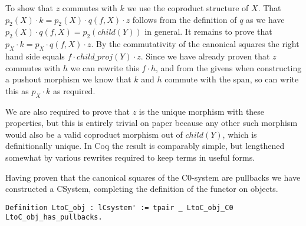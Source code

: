 To show that $z$ commutes with $k$ we use the coproduct structure of $X$. That
$p_2(X)\cdot k = p_2(X)\cdot q(f, X)\cdot z$ follows from the definition of $q$
as we have $p_2(X)\cdot q(f, X) = p_2(child(Y))$ in general. It remains to prove
that $p_X\cdot k = p_X\cdot q(f, X)\cdot z$. By the commutativity of the
canonical squares the right hand side equals $f\cdot child\_proj(Y)\cdot z$.
Since we have already proven that $z$ commutes with $h$ we can rewrite this
$f\cdot h$, and from the givens when constructing a pushout morphism we know
that $k$ and $h$ commute with the span, so can write this as $p_X\cdot k$ as
required.

We are also required to prove that $z$ is the unique morphism with these
properties, but this is entirely trivial on paper because any other such
morphism would also be a valid coproduct morphism out of $child(Y)$, which is
definitionally unique. In Coq the result is comparably simple, but lengthened
somewhat by various rewrites required to keep terms in useful forms.

Having proven that the canonical squares of the C0-system are pullbacks we have
constructed a CSystem, completing the definition of the functor on objects.
\begin{lstlisting}
Definition LtoC_obj : lCsystem' := tpair _ LtoC_obj_C0 LtoC_obj_has_pullbacks.
\end{lstlisting}